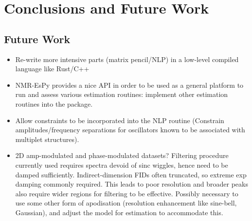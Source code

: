 \chapter{Conclusions and Future Work}

\section{Future Work}
\begin{itemize}
    \item Re-write more intensive parts (matrix pencil/NLP) in a low-level
        compiled language like Rust/C++
    \item NMR-EsPy provides a nice API in order to be used as a general
        platform to run and assess various estimation routines: implement other
        estimation routines into the package.
    \item Allow constraints to be incorporated into the NLP routine (Constrain
        amplitudes/frequency separations for oscillators known to be associated
        with multiplet structures).
    \item 2D amp-modulated and phase-modulated datasets? Filtering procedure
        currently used requires spectra devoid of sinc wiggles, hence need to
        be damped sufficiently. Indirect-dimension FIDs often truncated, so
        extreme exp damping commonly required. This leads to poor resolution
        and broader peaks also require wider regions for filtering to be
        effective. Possibly necessary to use some other form of apodisation
        (resolution enhancement like sine-bell, Gaussian), and adjust the model
        for estimation to accommodate this.
\end{itemize}
\label{chap:conclusions}

